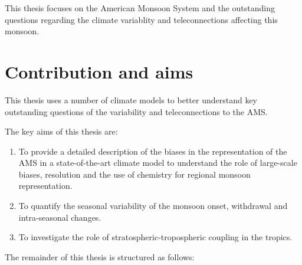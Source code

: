  This thesis focuses on the American Monsoon System and the outstanding questions regarding the climate variablity and teleconnections affecting this monsoon.
 
\section{Contribution and aims}
This thesis uses a number of climate models to better understand key outstanding questions of the variability and teleconnections to the AMS. 

The key aims of this thesis are: 

\begin{enumerate}
\item To provide a detailed description of the biases in the representation of the AMS in a state-of-the-art climate model to understand the role of large-scale biases, resolution and the use of chemistry for regional monsoon representation.
\item To quantify the seasonal variability of the monsoon onset, withdrawal and intra-seasonal changes.
\item To investigate the role of stratospheric-tropospheric coupling in the tropics. 
\end{enumerate}

The remainder of this thesis is structured as follows:

